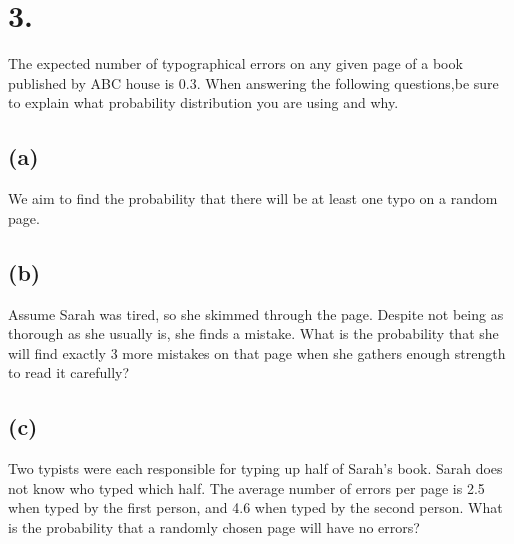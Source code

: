 \documentclass{article}
\begin{document}
\section*{3.}
{\Large 
The expected number of typographical errors on any given page of a book published
by ABC house is 0.3. 
When answering the following questions,be sure to explain what probability distribution you are using and why.

\subsection*{(a)}
We aim to find the probability that there will be at least one typo on a random page.


\subsection*{(b)}
Assume Sarah was tired, so she skimmed through the page. Despite not being as thorough as
she usually is, she finds a mistake. What is the probability that she will find exactly 3 more mistakes on
that page when she gathers enough strength to read it carefully?


\subsection*{(c)}
Two typists were each responsible for typing up half of Sarah's book. Sarah does not know who
typed which half. The average number of errors per page is 2.5 when typed by the first person, and 4.6
when typed by the second person. What is the probability that a randomly chosen page will have no errors?


}
\end{document}
